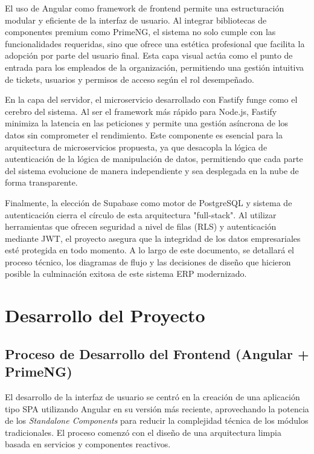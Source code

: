 \documentclass[12pt,a4paper]{article}
\begin{document}
El uso de Angular como framework de frontend permite una estructuración modular y eficiente de la interfaz de usuario. Al integrar bibliotecas de componentes premium como PrimeNG, el sistema no solo cumple con las funcionalidades requeridas, sino que ofrece una estética profesional que facilita la adopción por parte del usuario final. Esta capa visual actúa como el punto de entrada para los empleados de la organización, permitiendo una gestión intuitiva de tickets, usuarios y permisos de acceso según el rol desempeñado.

En la capa del servidor, el microservicio desarrollado con Fastify funge como el cerebro del sistema. Al ser el framework más rápido para Node.js, Fastify minimiza la latencia en las peticiones y permite una gestión asíncrona de los datos sin comprometer el rendimiento. Este componente es esencial para la arquitectura de microservicios propuesta, ya que desacopla la lógica de autenticación de la lógica de manipulación de datos, permitiendo que cada parte del sistema evolucione de manera independiente y sea desplegada en la nube de forma transparente.

Finalmente, la elección de Supabase como motor de PostgreSQL y sistema de autenticación cierra el círculo de esta arquitectura "full-stack". Al utilizar herramientas que ofrecen seguridad a nivel de filas (RLS) y autenticación mediante JWT, el proyecto asegura que la integridad de los datos empresariales esté protegida en todo momento. A lo largo de este documento, se detallará el proceso técnico, los diagramas de flujo y las decisiones de diseño que hicieron posible la culminación exitosa de este sistema ERP modernizado.

\newpage

\section{Desarrollo del Proyecto}

\subsection{Proceso de Desarrollo del Frontend (Angular + PrimeNG)}
El desarrollo de la interfaz de usuario se centró en la creación de una aplicación tipo SPA utilizando Angular en su versión más reciente, aprovechando la potencia de los \textit{Standalone Components} para reducir la complejidad técnica de los módulos tradicionales. El proceso comenzó con el diseño de una arquitectura limpia basada en servicios y componentes reactivos.
\end{document}
